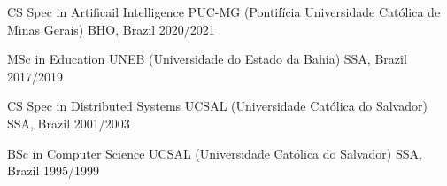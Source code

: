 


\begin{cvhonors}



\cvhonor
{CS Spec in Artificail Intelligence} %
{PUC-MG (Pontifícia Universidade Católica de Minas Gerais)} %
{BHO, Brazil} %
{2020/2021} %
    

\cvhonor
{MSc in Education} %
{UNEB (Universidade do Estado da Bahia)} %
{SSA, Brazil} %
{2017/2019} %



\cvhonor
{CS Spec in Distributed Systems} %
{UCSAL (Universidade Católica do Salvador)} %
{SSA, Brazil} %
{2001/2003} %
    

\cvhonor
{BSc in Computer Science} %
{UCSAL (Universidade Católica do Salvador)} %
{SSA, Brazil} %
{1995/1999} %


\end{cvhonors}
